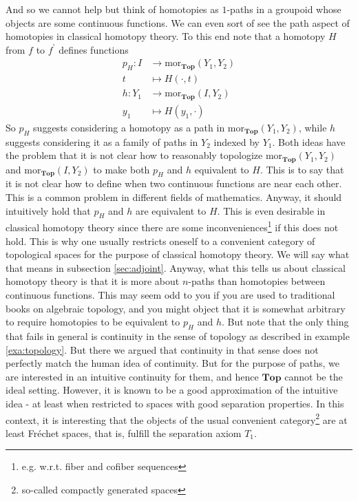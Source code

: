 And so we cannot help but think of homotopies as $1$-paths in a groupoid whose objects are some continuous functions.
We can even sort of see the path aspect of homotopies in classical homotopy theory.
To this end note that a homotopy $H$ from $f$ to $f^{\backprime}$ defines functions
\begin{align*}
  p_{H}
  \colon
  I
  &\rightarrow
  \mathrm{mor}_{\mathbf{Top}}(Y_{1},Y_{2})
  \\
  t
  &\mapsto
  H(\cdot,t)
  \\
  h
  \colon
  Y_{1}
  &\rightarrow
  \mathrm{mor}_{\mathbf{Top}}(I,Y_{2})
  \\
  y_{1}
  &\mapsto
  H(y_{1},\cdot)
\end{align*}
So $p_{H}$ suggests considering a homotopy as a path in $\mathrm{mor}_{\mathbf{Top}}(Y_{1},Y_{2})$, while $h$ suggests considering it as a family of paths in $Y_{2}$ indexed by $Y_{1}$.
Both ideas have the problem that it is not clear how to reasonably topologize $\mathrm{mor}_{\mathbf{Top}}(Y_{1},Y_{2})$ and $\mathrm{mor}_{\mathbf{Top}}(I,Y_{2})$ to make both $p_{H}$ and $h$ equivalent to $H$.
This is to say that it is not clear how to define when two continuous functions are near each other.
This is a common problem in different fields of mathematics.
Anyway, it should intuitively hold that $p_{H}$ and $h$ are equivalent to $H$.
This is even desirable in classical homotopy theory since there are some inconveniences\footnote{e.g. w.r.t. fiber and cofiber sequences} if this does not hold.
This is why one usually restricts oneself to a convenient category of topological spaces for the purpose of classical homotopy theory.
We will say what that means in subsection \ref{sec:adjoint}.
Anyway, what this tells us about classical homotopy theory is that it is more about $n$-paths than homotopies between continuous functions.
This may seem odd to you if you are used to traditional books on algebraic topology, and you might object that it is somewhat arbitrary to require homotopies to be equivalent to $p_{H}$ and $h$.
But note that the only thing that fails in general is continuity in the sense of topology as described in example \ref{exa:topology}.
But there we argued that continuity in that sense does not perfectly match the human idea of continuity.
But for the purpose of paths, we are interested in an intuitive continuity for them, and hence $\mathbf{Top}$ cannot be the ideal setting.
However, it is known to be a good approximation of the intuitive idea - at least when restricted to spaces with good separation properties.
In this context, it is interesting that the objects of the usual convenient category\footnote{so-called compactly generated spaces} are at least Fr\'{e}chet spaces, that is, fulfill the separation axiom $T_{1}$.
